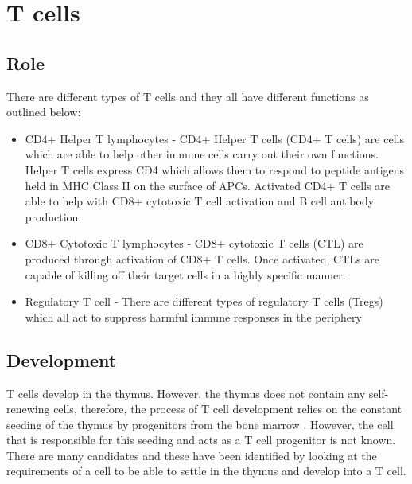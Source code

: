 


\section{T cells}
\subsection{Role}
\label{subsec:Tcellfunctions}

There are different types of T cells and they all have different functions as outlined below:


\begin{itemize}
\item CD4+ Helper T lymphocytes - CD4+ Helper T cells (CD4+ T cells) are cells which are able to help other immune cells carry out their own functions. 
Helper T cells express CD4 which allows them to respond to peptide antigens held in MHC Class II on the surface of APCs. 
Activated CD4+ T cells are able to help with CD8+ cytotoxic T cell activation and B cell antibody production.
\item CD8+ Cytotoxic T lymphocytes - CD8+ cytotoxic T cells (CTL) are produced through activation of CD8+ T cells.
Once activated, CTLs are capable of killing off their target cells in a highly specific manner.
\item Regulatory T cell - There are different types of regulatory T cells (Tregs) which all act to suppress harmful immune responses in the periphery
\end{itemize}


\subsection{Development}
\label{subsec:Tcelldevelopment}

T cells develop in the thymus.
However, the thymus does not contain any self-renewing cells, therefore, the process of T cell development relies on the constant seeding of the thymus by progenitors from the bone marrow \citep{Zlotoff2011, Heinzel2007}.
However, the cell that is responsible for this seeding and acts as a T cell progenitor is not known.
There are many candidates and these have been identified by looking at the requirements of a cell to be able to settle in the thymus and develop into a T cell.

